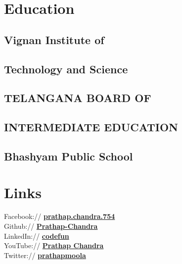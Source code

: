 \documentclass[]{deedy-resume-openfont}
\begin{document}
%
%
\lastupdated

%
%

%
%

\begin{minipage}[t]{0.33\textwidth} 


\section{Education} 
\subsection{Vignan Institute of}
\subsection{Technology and Science}
\sectionsep

\subsection{TELANGANA BOARD OF}
\subsection{INTERMEDIATE EDUCATION}
\sectionsep

\subsection{Bhashyam Public School}
\sectionsep


\section{Links} 
Facebook:// \href{https://facebook.com/prathap.chandra.754}{\bf prathap.chandra.754} \\
Github:// \href{https://github.com/Prathap-Chandra}{\bf Prathap-Chandra} \\
LinkedIn://  \href{https://www.linkedin.com/in/codefun/}{\bf codefun} \\
YouTube://  \href{https://www.youtube.com/channel/UChfA9tIKEAduV_kxuHyAIkA}{\bf Prathap Chandra} \\
Twitter://  \href{https://twitter.com/prathapmoola}{\bf prathapmoola} \\


\end{minipage}
\end{document}

